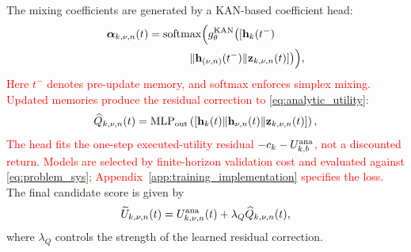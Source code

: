 \documentclass[10pt,letterpaper,journal]{IEEEtran}
\newcommand{\revnew}[1]{\textcolor{red}{#1}}
\begin{document}
The mixing coefficients are generated by a KAN-based coefficient head:
\begin{equation}
\begin{aligned}
\boldsymbol\alpha_{k,\nu,n}(t)=\mathrm{softmax}\Bigl(g^{\rm KAN}_\theta\bigl(
[&\mathbf{h}_k(t^-)\\
\Vert\mathbf{h}_{(\nu,n)}(t^-)&\Vert\mathbf{z}_{k,\nu,n}(t)]\bigr)\Bigr),
\end{aligned}   
\label{eq:alpha_main}
\end{equation}
\revnew{Here $t^-$ denotes pre-update memory, and softmax enforces simplex mixing. Updated memories produce the residual correction to \eqref{eq:analytic_utility}:}
\begin{equation}
\widehat Q_{k,\nu,n}(t)
=
{\rm MLP}_{\rm out}
\left(
[
\mathbf h_k(t)
\Vert
\mathbf h_{\nu,n}(t)
\Vert
\mathbf z_{k,\nu,n}(t)
]
\right),
\label{eq:residual_score}
\end{equation}
\revnew{The head fits the one-step executed-utility residual $-c_k-U^{\rm ana}_{k,b}$, not a discounted return. Models are selected by finite-horizon validation cost and evaluated against \eqref{eq:problem_sys}; Appendix~\ref{app:training_implementation} specifies the loss.}
The final candidate score is given by
\begin{equation}
\widetilde{U}_{k,\nu,n}(t)
=
U^{\rm ana}_{k,\nu,n}(t)
+
\lambda_Q \widehat Q_{k,\nu,n}(t),
\label{eq:U_final_main}
\end{equation}
where $\lambda_Q$ controls the strength of the learned residual correction.
\end{document}
